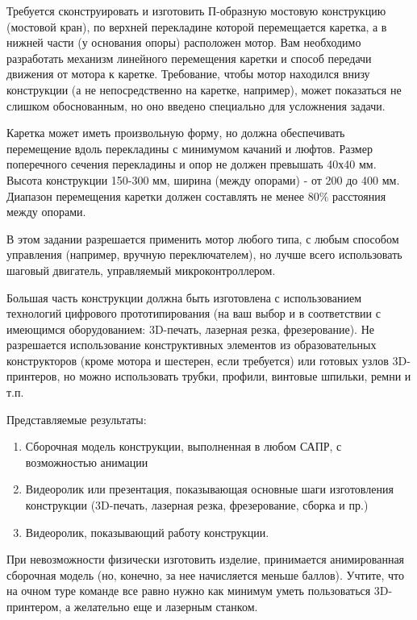

Требуется сконструировать и изготовить П-образную мостовую конструкцию (мостовой кран), 
по верхней перекладине которой перемещается каретка, а в нижней части (у основания опоры) 
расположен мотор. Вам необходимо разработать механизм линейного перемещения каретки и способ 
передачи движения от мотора к каретке. Требование, чтобы мотор находился внизу конструкции 
(а не непосредственно на каретке, например), может показаться не слишком обоснованным, 
но оно введено специально для усложнения задачи.

Каретка может иметь произвольную форму, но должна обеспечивать перемещение вдоль 
перекладины с минимумом качаний и люфтов. Размер поперечного сечения перекладины и 
опор не должен превышать 40х40 мм. Высота конструкции 150-300 мм, ширина (между опорами) - 
от 200 до 400 мм. Диапазон перемещения каретки должен составлять не менее $80\%$ расстояния между опорами.

В этом задании разрешается применить мотор любого типа, с любым способом управления 
(например, вручную переключателем), но лучше всего использовать шаговый двигатель, управляемый 
микроконтроллером.

Большая часть конструкции должна быть изготовлена с 
использованием технологий цифрового прототипирования (на ваш выбор и в соответствии 
с имеющимся оборудованием: 3D-печать, лазерная резка, фрезерование). Не разрешается использование 
конструктивных элементов из образовательных конструкторов (кроме мотора и шестерен, если требуется) или готовых узлов 3D-принтеров, но можно использовать трубки, профили, винтовые шпильки, ремни и т.п.  

Представляемые результаты:

\begin{enumerate}
    \item Сборочная модель конструкции, выполненная в любом САПР, с возможностью анимации
    \item Видеоролик или презентация, показывающая основные шаги изготовления конструкции (3D-печать, лазерная резка, фрезерование, сборка и пр.)
    \item Видеоролик, показывающий работу конструкции.
\end{enumerate}

При невозможности физически изготовить изделие, принимается анимированная сборочная модель 
(но, конечно, за нее начисляется меньше баллов). Учтите, что на очном туре команде все равно 
нужно как минимум уметь пользоваться 3D-принтером, а желательно еще и лазерным станком.

